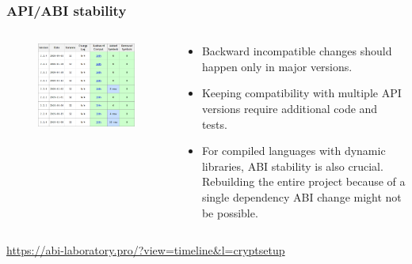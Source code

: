 \documentclass[aspectratio=169]{beamer}              %
\begin{document}
\begin{frame}
	\frametitle{API/ABI stability}
	
	\begin{columns}

\begin{column}{0.5\textwidth}
	\begin{figure}[ht!]
	\begin{center}
  	  \includegraphics[width=\textwidth]{img/abi.png}
	\end{center}
	\end{figure}
\end{column}

\begin{column}{0.5\textwidth}
	\begin{block}{}
		\begin{itemize}
			\item Backward incompatible changes should happen only in major versions.
			\item Keeping compatibility with multiple API versions require additional code and tests.
			\item For compiled languages with dynamic libraries, ABI stability is also crucial. Rebuilding the entire project because of a single dependency ABI change might not be possible.
		\end{itemize}
	\end{block}

\end{column}
\end{columns}
\tiny{\url{https://abi-laboratory.pro/?view=timeline&l=cryptsetup}}
\end{frame}
\end{document}
